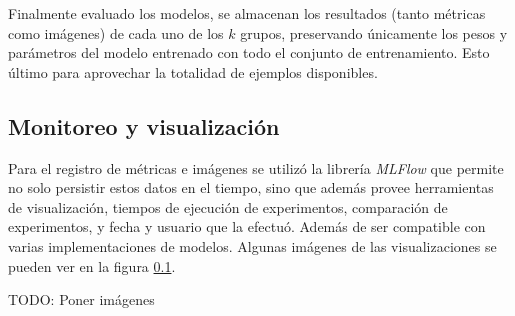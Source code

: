Finalmente evaluado los modelos, se almacenan los resultados (tanto métricas como imágenes) de cada uno de los $k$ grupos, preservando únicamente los pesos y parámetros del modelo entrenado con todo el conjunto de entrenamiento. Esto último para aprovechar la totalidad de ejemplos disponibles.

\subsection{Monitoreo y visualización}

Para el registro de métricas e imágenes se utilizó la librería \emph{MLFlow} \cite{} que permite no solo persistir estos datos en el tiempo, sino que además provee herramientas de visualización, tiempos de ejecución de experimentos, comparación de experimentos, y fecha y usuario que la efectuó. Además de ser compatible con varias implementaciones de modelos. Algunas imágenes de las visualizaciones se pueden ver en la figura \ref{}.

TODO: Poner imágenes

